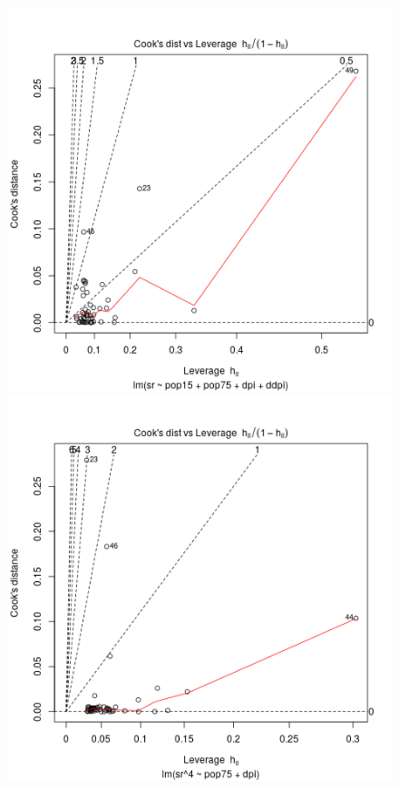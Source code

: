 \begin{figure}[p]
  \begin{center}
    \includegraphics[scale=0.48]{imgR/plot16.png} \hspace*{2cm}
	\includegraphics[scale=0.48]{imgR/plot26.png} \\

\end{center}
\end{figure}
